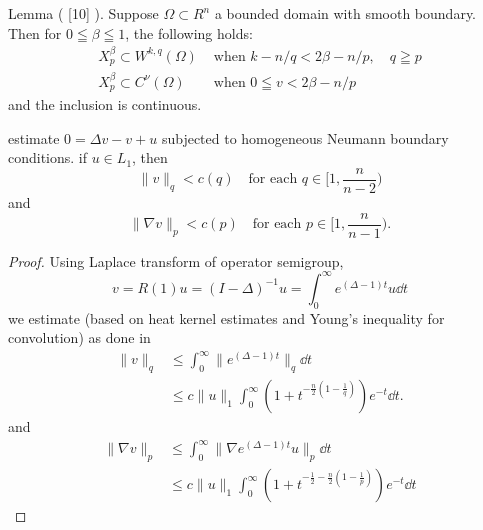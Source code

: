 Lemma ( [10] ). Suppose $\Omega \subset R^{n}$ a bounded domain with smooth boundary. Then for $0 \leqq \beta \leqq 1$, the following holds:
$$
\begin{array}{ll}
	X_{p}^{\beta} \subset W^{k, q}(\Omega) & \text { when } k-n / q<2 \beta-n / p, \quad q \geqq p \\
	X_{p}^{\beta} \subset C^{\nu}(\Omega) & \text { when } 0 \leqq v<2 \beta-n / p
\end{array}
$$
and the inclusion is continuous.

\begin{example}
estimate \(0=\Delta v - v + u\) subjected to homogeneous Neumann boundary conditions.
if \(u\in L_1\), then 
\[  
    \|v\|_q<c(q) \quad\text{for each }q\in[1,\frac{n}{n-2})
\]
and
\[
    \|\nabla v\|_p<c(p)\quad\text{for each }p\in[1,\frac{n}{n-1}).
\]
\end{example}
\begin{proof}
  Using Laplace transform of operator semigroup, 
  \[
    v = R(1)u=(I-\Delta)^{-1} u = \int_0^\infty e^{(\Delta-1)t}u\dd t
  \]
  we estimate (based on heat kernel estimates and Young's inequality for convolution) as done in \cite[Lemma 1.3]{Winkler2010}
  \begin{align*}
    \|v\|_q &\leq\int_0^\infty \|e^{(\Delta-1)t}\|_q\dd t\\
    &\leq c\|u\|_1\int_0^\infty (1+t^{-\frac{n}{2}(1-\frac1q)})e^{-t}\dd t. 
  \end{align*}
  and
  \begin{align*}
    \|\nabla v\|_p & \leq \int_0^\infty\|\nabla e^{(\Delta-1)t}u\|_p\dd t\\
    &\leq c\|u\|_1\int_0^\infty (1+t^{-\frac{1}{2} - \frac{n}{2}(1-\frac{1}{p})})e^{-t}\dd t    
  \end{align*}
\end{proof}

